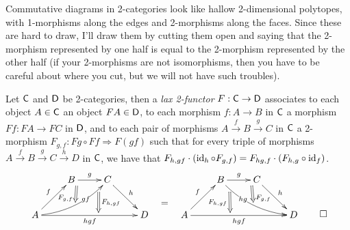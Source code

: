  Commutative diagrams in 2-categories look like hallow 2-dimensional polytopes, with
 1-morphisms along the edges and 2-morphisms along the faces. Since these are hard to
 draw, I'll draw them by cutting them open and saying that the 2-morphism represented by
 one half is equal to the 2-morphism represented by the other half (if your 2-morphisms
 are not isomorphisms, then you have to be careful about where you cut, but we will not
 have such troubles).

 \begin{definition}
   Let $\text{\sf C}$ and $\text{\sf D}$ be 2-categories, then a \emph{lax 2-functor} $F:\text{\sf C}\to \text{\sf D}$ associates
   to each object $A\in \text{\sf C}$ an object $FA\in \text{\sf D}$, to each morphism $f:A\to B$ in $\text{\sf C}$ a
   morphism $Ff:FA\to FC$ in $\text{\sf D}$, and to each pair of morphisms $A\xrightarrow f
   B\xrightarrow g C$ in $\text{\sf C}$ a 2-morphism $F_{g,f}:Fg\circ Ff\Rightarrow F(gf)$ such
   that for every triple of morphisms $A\xrightarrow f B\xrightarrow g C\xrightarrow h D$
   in $\text{\sf C}$, we have that $F_{h,gf}\cdot (\operatorname{id}_h\circ F_{g,f})=F_{hg,f}\cdot
   (F_{h,g}\circ\operatorname{id}_f)$.
   \[\raisebox{3pc}{$\xymatrix{
    & B\ar[r]^g_(.15){\ }="a" & C\ar[dr]^h\\
    A\ar[rrr]_{hgf}^(.58){}="d" \ar@/_2ex/[urr]|(.65){gf}^{}="b"_(.85){}="c" \ar[ur]^f
      & & & D
    \ar@{=>}_(.7){F_{g,f}} "a";"b"
    \ar@{=>}^{F_{h,gf}} "c";"d"
   }\quad\raisebox{-2pc}{$=$}\quad
   \xymatrix{
    & B\ar[r]^g_(.85){\ }="a" \ar@/_2ex/[rrd]|(.35){hg}^{}="b"_(.15){}="c" & C\ar[dr]^h\\
    A\ar[rrr]_{hgf}^(.42){}="d" \ar[ur]^f & & & D
    \ar@{=>}^(.7){F_{g,f}} "a";"b"
    \ar@{=>}_{F_{h,gf}} "c";"d"
   }$}\qedhere\]
 \end{definition}
